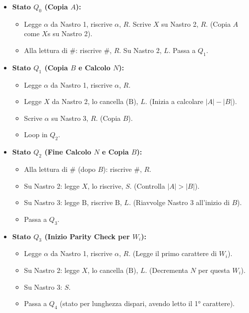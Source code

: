 \documentclass[a4paper, 11pt]{book} %
\theoremstyle{definition}
\newcommand{\B}{\text{B}} %
\begin{document}
\begin{itemize}
    \item \textbf{Stato $Q_0$ (Copia $A$):}
        \begin{itemize}
            \item Legge $\alpha$ da Nastro 1, riscrive $\alpha$, $R$. Scrive $X$ su Nastro 2, $R$. (Copia $A$ come $X$s su Nastro 2).
            \item Alla lettura di $\#$: riscrive $\#$, $R$. Su Nastro 2, $L$. Passa a $Q_1$.
        \end{itemize}
    \item \textbf{Stato $Q_1$ (Copia $B$ e Calcolo $N$):}
        \begin{itemize}
            \item Legge $\alpha$ da Nastro 1, riscrive $\alpha$, $R$.
            \item Legge $X$ da Nastro 2, lo cancella ($\B$), $L$. (Inizia a calcolare $|A|-|B|$).
            \item Scrive $\alpha$ su Nastro 3, $R$. (Copia $B$).
            \item Loop in $Q_2$.
        \end{itemize}
    \item \textbf{Stato $Q_2$ (Fine Calcolo $N$ e Copia $B$):}
        \begin{itemize}
            \item Alla lettura di $\#$ (dopo $B$): riscrive $\#$, $R$.
            \item Su Nastro 2: legge $X$, lo riscrive, $S$. (Controlla $|A|>|B|$).
            \item Su Nastro 3: legge $\B$, riscrive $\B$, $L$. (Riavvolge Nastro 3 all'inizio di $B$).
            \item Passa a $Q_3$.
        \end{itemize}
    \item \textbf{Stato $Q_3$ (Inizio Parity Check per $W_i$):}
        \begin{itemize}
            \item Legge $\alpha$ da Nastro 1, riscrive $\alpha$, $R$. (Legge il primo carattere di $W_i$).
            \item Su Nastro 2: legge $X$, lo cancella ($\B$), $L$. (Decrementa $N$ per questa $W_i$).
            \item Su Nastro 3: $S$.
            \item Passa a $Q_4$ (stato per lunghezza dispari, avendo letto il 1° carattere).
        \end{itemize}

\end{itemize}
\end{document}
